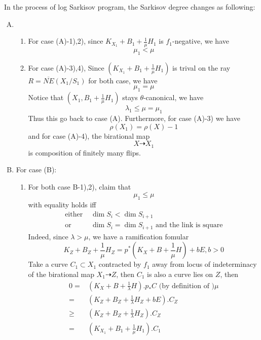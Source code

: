 \documentclass{article}
\begin{document}
In the process of log Sarkisov program, the Sarkisov degree changes as following:
\begin{enumerate}[(A)]
  \item 
  \begin{enumerate}[1)]
    \item For case (A)-1),2),  since $ K_{X_1}+B_1+\frac{1}{\mu}H_1 $ is $ f_1 $-negative, we have 
    $$ \mu_1<\mu $$
    \item For case (A)-3),4), Since $ (K_{X_1}+B_1+\frac{1}{\mu}H_1) $ is trival on the ray $ R=\overline{NE}(X_1/S_1) $ for both case, we have
    $$ \mu_1=\mu $$
    Notice that $ (X_1,B_1+\frac{1}{\mu}H_1) $ stays $ \theta $-canonical, we have
    $$ \lambda_1\leqslant \mu=\mu_1 $$
    Thus this go back to case (A). Furthermore,   for case (A)-3) we have
    $$ \rho(X_1)=\rho(X)-1 $$
    and for case (A)-4), the birational map
    $$ X\dashrightarrow X_1 $$
    is composition of finitely many flips.
  \end{enumerate} 
  \item For case (B): 
  \begin{enumerate}[1)]
    \item For both case B-1),2), claim that 
    $$ \mu_1\leqslant \mu $$
    with equality holds iff 
    \begin{equation*}
      \begin{aligned}
        \text{either } &\dim S_i<\dim S_{i+1} \\
        \text{or }&\dim S_i=\dim S_{i+1} \text{ and the link is square} 
      \end{aligned}
    \end{equation*} 
    Indeed, since $ \lambda>\mu $, we have a ramification fomular
    $$ K_Z+B_Z+\frac{1}{\mu}H_Z=p^*(K_X+B+\frac{1}{\mu}H)+bE, b>0 $$
    Take a curve $ C_1\subset X_1 $ contracted by $ f_1 $ away from locus of indeterminacy of the birational map $ X_1\dashrightarrow Z $, then $ C_1 $ is also a curve lies on $ Z $, then
    \begin{equation*}
      \begin{aligned}
        0=& (K_{X}+B+\frac{1}{\lambda}H).p_*C \text{ (by definition of )} \mu\\
        =&(K_{Z}+B_{Z}+\frac{1}{\lambda}H_Z+bE).C_{Z}\\
        \geqslant&(K_Z+B_Z+\frac{1}{\lambda}H_Z).C_Z\\
        =&(K_{X_1}+B_1+\frac{1}{\mu}H_1).C_1
      \end{aligned}
    \end{equation*} 

\end{enumerate}
\end{enumerate}
\end{document}
